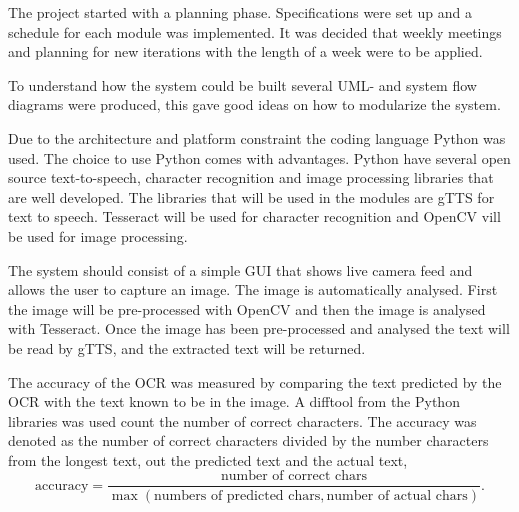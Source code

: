 \documentclass[../main.tex]{subfiles}
\begin{document}
The project started with a planning phase. Specifications were set up and a schedule for each module was implemented. It was decided that weekly meetings and planning for new iterations with the length of a week were to be applied. 

To understand how the system could be built several UML- and system flow diagrams were produced, this gave good ideas on how to modularize the system.

Due to the architecture and platform constraint the coding language Python was used. The choice to use Python comes with advantages. Python have several open source text-to-speech, character recognition and image processing libraries that are well developed. The libraries that will be used in the modules are gTTS for text to speech. Tesseract will be used for character recognition and OpenCV vill be used for image processing. 

The system should consist of a simple GUI that shows live camera feed and allows the user to capture an image. The image is automatically analysed. First the image will be pre-processed with OpenCV and then the image is analysed with Tesseract. Once the image has been pre-processed and analysed the text will be read by gTTS, and the extracted text will be returned.

The accuracy of the OCR was measured by comparing the text predicted by the OCR with the text known to be in the image. A difftool from the Python libraries was used count the number of correct characters. The accuracy was denoted as the number of correct characters divided by the number characters from the longest text, out the predicted text and the actual text,
$$
    \text{accuracy} = 
    \frac
        {\text{number of correct chars}}
        {\max(\text{numbers of predicted chars},
              \text{number of actual chars})
        }.
$$
\end{document}
